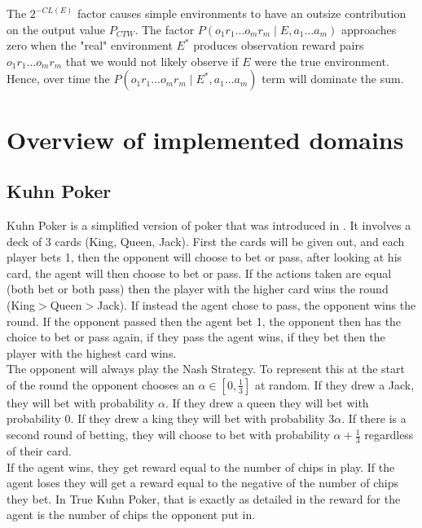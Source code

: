 \documentclass{article}
\theoremstyle{definition}
\newtheorem{primary statistics}[definition]{Primary Statistics}
\newtheorem{auxiliary statistics}[definition]{Auxiliary Statistics}
\begin{document}
The $2^{-CL(E)}$ factor causes simple environments to have an outsize contribution on the output value $P_{CTW}$. The factor $P(o_1r_1 \ldots o_mr_m \mid E, a_1 \ldots a_m)$ approaches zero when the "real" environment $E^*$ produces observation reward pairs $o_1r_1 \ldots o_mr_m$ that we would not likely observe if $E$ were the true environment. Hence, over time the $P(o_1r_1 \ldots o_mr_m \mid E^*, a_1 \ldots a_m)$ term will dominate the sum. 


\section{Overview of implemented domains}
\subsection{Kuhn Poker}
Kuhn Poker is a simplified version of poker that was introduced in \citep{kuhn1950simplified}. It involves a deck of 3 cards (King, Queen, Jack). First the cards will be given out, and each player bets 1, then the opponent will choose to bet or pass, after looking at his card, the agent will then choose to bet or pass. If the actions taken are equal (both bet or both pass) then the player with the higher card wins the round (King$>$Queen$>$Jack). If instead the agent chose to pass, the opponent wins the round. If the opponent passed then the agent bet 1, the opponent then has the choice to bet or pass again, if they pass the agent wins, if they bet then the player with the highest card wins. \\

The opponent will always play the Nash Strategy. To represent this at the start of the round the opponent chooses an $\alpha\in [0,\frac{1}{3}]$ at random. If they drew a Jack, they will bet with probability $\alpha$. If they drew a queen they will bet with probability 0. If they drew a king they will bet with probability $3\alpha$. If there is a second round of betting, they will choose to bet with probability $\alpha+\frac{1}{3}$ regardless of their card. \\

If the agent wins, they get reward equal to the number of chips in play. If the agent loses they will get a reward equal to the negative of the number of chips they bet. In True Kuhn Poker, that is exactly as detailed in \citep{kuhn1950simplified} the reward for the agent is the number of chips the opponent put in.
\end{document}

